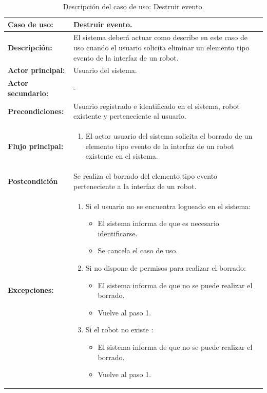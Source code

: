 \begin{table}[H]
  \begin{center}
    \begin{tabular}{|p{3.5cm}|p{10cm}|}
      \hline
      {\textbf{Caso de uso:}} & { Destruir evento.} \\
      \hline
      {\textbf{Descripción:}} & { El sistema deberá actuar como describe en este caso de uso cuando el usuario solicita eliminar un elemento tipo evento de la interfaz de un robot.} \\
     \hline
      {\textbf{Actor principal:}} & { Usuario del sistema.} \\
      \hline
      {\textbf{Actor secundario:}} & { - } \\
      \hline
      {\textbf{Precondiciones:}} & { Usuario registrado e identificado en el sistema, robot existente y perteneciente al usuario. } \\
     \hline   
    {\textbf{Flujo principal:}} & { 
      \begin{enumerate}
	\item El actor usuario del sistema solicita el borrado de un elemento tipo evento de la interfaz de un robot existente en el sistema.
      \end{enumerate}
      } \\
     \hline
     {\textbf{Postcondición}} & {Se realiza el borrado del elemento tipo evento perteneciente a la interfaz de un robot.}\\
     \hline
         {\textbf{Excepciones:}} & {
         \begin{enumerate}
         
          \item Si el usuario no se encuentra logueado en el sistema:
	  \begin{itemize}
	    \item El sistema informa de que es necesario identificarse.
	    \item Se cancela el caso de uso.
	  \end{itemize}
         
          \item Si no dispone de permisos para realizar el borrado:
          \begin{itemize}
           \item El sistema informa de que no se puede realizar el borrado.
           \item Vuelve al paso 1.
          \end{itemize}
	  \item Si el robot no existe :
	    \begin{itemize}
	      \item El sistema informa de que no se puede realizar el borrado.
	      \item Vuelve al paso 1.
	   \end{itemize}	   
         \end{enumerate}
         }\\
     \hline
    \end{tabular}
  \end{center}
\caption{Descripción del caso de uso: Destruir evento.}
\end{table}
